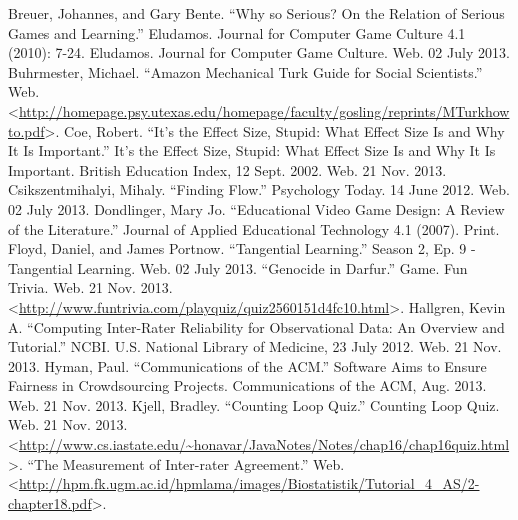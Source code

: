 \documentclass[12pt]{report}
\begin{document}
\begin{thebibliography}{1}





\bibitem{} Breuer, Johannes, and Gary Bente. ``Why so Serious? On the Relation of Serious Games and Learning.'' Eludamos. Journal for Computer Game Culture 4.1 (2010): 7-24. Eludamos. Journal for Computer Game Culture. Web. 02 July 2013.
\bibitem{} Buhrmester, Michael. ``Amazon Mechanical Turk Guide for Social Scientists.'' Web. \textless \url{http://homepage.psy.utexas.edu/homepage/faculty/gosling/reprints/MTurkhowto.pdf}\textgreater.
\bibitem{} Coe, Robert. ``It's the Effect Size, Stupid: What Effect Size Is and Why It Is Important.'' It's the Effect Size, Stupid: What Effect Size Is and Why It Is Important. British Education Index, 12 Sept. 2002. Web. 21 Nov. 2013.
\bibitem{} Csikszentmihalyi, Mihaly. ``Finding Flow.'' Psychology Today. 14 June 2012. Web. 02 July 2013.
\bibitem{} Dondlinger, Mary Jo. ``Educational Video Game Design: A Review of the Literature.'' Journal of Applied Educational Technology 4.1 (2007). Print.
\bibitem{} Floyd, Daniel, and James Portnow. ``Tangential Learning.'' Season 2, Ep. 9 - Tangential Learning. Web. 02 July 2013.
\bibitem{} ``Genocide in Darfur.'' Game. Fun Trivia. Web. 21 Nov. 2013. \textless \url{http://www.funtrivia.com/playquiz/quiz2560151d4fc10.html}\textgreater.
\bibitem{} Hallgren, Kevin A. ``Computing Inter-Rater Reliability for Observational Data: An Overview and Tutorial.'' NCBI. U.S. National Library of Medicine, 23 July 2012. Web. 21 Nov. 2013.
\bibitem{} Hyman, Paul. ``Communications of the ACM.'' Software Aims to Ensure Fairness in Crowdsourcing Projects. Communications of the ACM, Aug. 2013. Web. 21 Nov. 2013.
\bibitem{} Kjell, Bradley. ``Counting Loop Quiz.'' Counting Loop Quiz. Web. 21 Nov. 2013. \textless \url{http://www.cs.iastate.edu/~honavar/JavaNotes/Notes/chap16/chap16quiz.html}\textgreater.
\bibitem{} ``The Measurement of Inter-rater Agreement.'' Web. \textless \url{http://hpm.fk.ugm.ac.id/hpmlama/images/Biostatistik/Tutorial\_4\_AS/2-chapter18.pdf}\textgreater.

\end{thebibliography}
\end{document}
